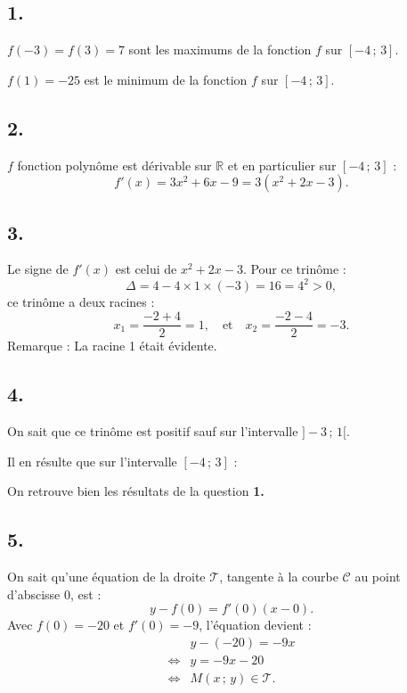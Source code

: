 \subsection*{1.}

\(f(-3) = f(3) = 7\) sont les maximums de la fonction \(f\) sur \([-4\,;\,3]\).

\(f(1) = -25 \) est le minimum de la fonction \(f\) sur \([-4\,;\,3]\).

\subsection*{2.}

\(f\) fonction polynôme est dérivable sur \(\mathbb{R}\) et en particulier sur \([-4\,;\,3]\) :
\[
f'(x) = 3x^2 + 6x - 9 = 3(x^2 + 2x - 3).
\]

\subsection*{3.}

Le signe de \( f'(x) \) est celui de \( x^2 + 2x - 3 \). Pour ce trinôme :
\[
\Delta = 4 - 4 \times 1 \times (-3) = 16 = 4^2 > 0,
\]
ce trinôme a deux racines :
\[
x_1 = \frac{-2 + 4}{2} = 1, \quad \text{et} \quad x_2 = \frac{-2 - 4}{2} = -3.
\]
Remarque : La racine 1 était évidente.

\subsection*{4.}

On sait que ce trinôme est positif sauf sur l'intervalle \( ]-3\,;\,1[ \).

Il en résulte que sur l'intervalle \([-4\,;\,3]\) :
\begin{center}
\end{center}
On retrouve bien les résultats de la question \textbf{1.}

\subsection*{5.}

On sait qu'une équation de la droite \( \mathcal{T} \), tangente à la courbe \( \mathcal{C} \) au point d'abscisse 0, est :
\[
y - f(0) = f'(0)(x - 0).
\]
Avec \( f(0) = -20 \) et \( f'(0) = -9 \), l'équation devient :
\begin{align*}
&y - (-20) = -9x \\
\iff &y = -9x - 20 \\
\iff &M(x\,;\,y) \in \mathcal{T}.
\end{align*}

